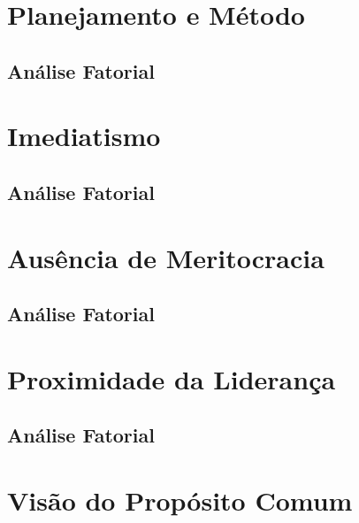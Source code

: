 \documentclass[]{book}
\begin{document}
\hypertarget{planejamento-e-metodo}{%
\section{Planejamento e Método}\label{planejamento-e-metodo}}

\hypertarget{analise-fatorial-3}{%
\subsection{Análise Fatorial}\label{analise-fatorial-3}}

\hypertarget{imediatismo}{%
\section{Imediatismo}\label{imediatismo}}

\hypertarget{analise-fatorial-4}{%
\subsection{Análise Fatorial}\label{analise-fatorial-4}}

\hypertarget{ausencia-de-meritocracia}{%
\section{Ausência de Meritocracia}\label{ausencia-de-meritocracia}}

\hypertarget{analise-fatorial-5}{%
\subsection{Análise Fatorial}\label{analise-fatorial-5}}

\hypertarget{proximidade-da-lideranca}{%
\section{Proximidade da Liderança}\label{proximidade-da-lideranca}}

\hypertarget{analise-fatorial-6}{%
\subsection{Análise Fatorial}\label{analise-fatorial-6}}

\hypertarget{visao-do-proposito-comum}{%
\section{Visão do Propósito Comum}\label{visao-do-proposito-comum}}
\end{document}
